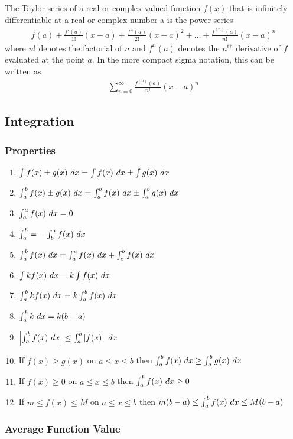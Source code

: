 The Taylor series of a real or complex-valued function $f(x)$ that is infinitely differentiable at a real or complex number a is the power series
\begin{align*}
	f(a)+\frac{f'(a)}{1!}(x-a)+\frac{f''(a)}{2!}(x-a)^2+\dots+\frac{f^{(n)}(a)}{n!}(x-a)^n
\end{align*}
where $n!$ denotes the factorial of $n$ and $f^{n}(a)$ denotes the $n^\text{th}$ derivative of $f$ evaluated at the point $a$. In the more compact sigma notation, this can be written as 
\begin{align*}
	\sum_{n=0}^\infty\frac{f^{(n)}(a)}{n!}(x-a)^n
\end{align*}

\subsection{Integration}

\subsubsection*{Properties}

\begin{enumerate}
	\item $\int f(x)\pm g(x)\ dx=\int f(x)\ dx\pm\int g(x)\ dx$
	\item $\int_a^b f(x)\pm g(x)\ dx=\int_a^b f(x)\ dx\pm\int_a^b g(x)\ dx$
	\item $\int_a^a f(x)\ dx=0$
	\item $\int_a^b=-\int_b^a f(x)\ dx$
	\item $\int_a^b f(x)\ dx=\int_a^c f(x)\ dx+\int_c^b f(x)\ dx$
	\item $\int kf(x)\ dx=k\int f(x)\ dx$
	\item $\int_a^b kf(x)\ dx=k\int_a^b f(x)\ dx$
	\item $\int_a^b k\ dx=k(b-a)$
	\item $\left\vert\int_a^b f(x)\ dx\right\vert\leq\int_a^b\left\vert f(x)\right\vert\ dx$
	\item If $f(x)\geq g(x)$ on $a\leq x\leq b$ then $\int_a^b f(x)\ dx\geq\int_a^b g(x)\ dx$
	\item If $f(x)\geq0$ on $a\leq x\leq b$ then $\int_a^b f(x)\ dx\geq0$
	\item If $m\leq f(x)\leq M$ on $a\leq x\leq b$ then $m(b-a)\leq\int_a^b f(x)\ dx\leq M(b-a)$
\end{enumerate}

\subsubsection*{Average Function Value}

